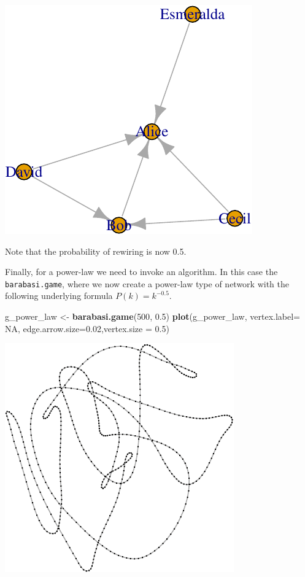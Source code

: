 \documentclass[]{article}
\newenvironment{Shaded}{\begin{snugshade}}{\end{snugshade}}
\newcommand{\KeywordTok}[1]{\textcolor[rgb]{0.13,0.29,0.53}{\textbf{{#1}}}}
\newcommand{\DataTypeTok}[1]{\textcolor[rgb]{0.13,0.29,0.53}{{#1}}}
\newcommand{\DecValTok}[1]{\textcolor[rgb]{0.00,0.00,0.81}{{#1}}}
\newcommand{\FloatTok}[1]{\textcolor[rgb]{0.00,0.00,0.81}{{#1}}}
\newcommand{\StringTok}[1]{\textcolor[rgb]{0.31,0.60,0.02}{{#1}}}
\newcommand{\OtherTok}[1]{\textcolor[rgb]{0.56,0.35,0.01}{{#1}}}
\newcommand{\NormalTok}[1]{{#1}}
\begin{document}
\includegraphics{ResearchTools_files/figure-latex/unnamed-chunk-52-1.pdf}

Note that the probability of rewiring is now 0.5.

Finally, for a power-law we need to invoke an algorithm. In this case
the \texttt{barabasi.game}, where we now create a power-law type of
network with the following underlying formula \(P(k) = k^{-0.5}\).

\begin{Shaded}
\begin{Highlighting}[]
\NormalTok{g_power_law <-}\StringTok{ }\KeywordTok{barabasi.game}\NormalTok{(}\DecValTok{500}\NormalTok{, }\FloatTok{0.5}\NormalTok{)}
\KeywordTok{plot}\NormalTok{(g_power_law, }\DataTypeTok{vertex.label=} \OtherTok{NA}\NormalTok{, }\DataTypeTok{edge.arrow.size=}\FloatTok{0.02}\NormalTok{,}\DataTypeTok{vertex.size =} \FloatTok{0.5}\NormalTok{)}
\end{Highlighting}
\end{Shaded}

\includegraphics{ResearchTools_files/figure-latex/unnamed-chunk-53-1.pdf}
\end{document}
